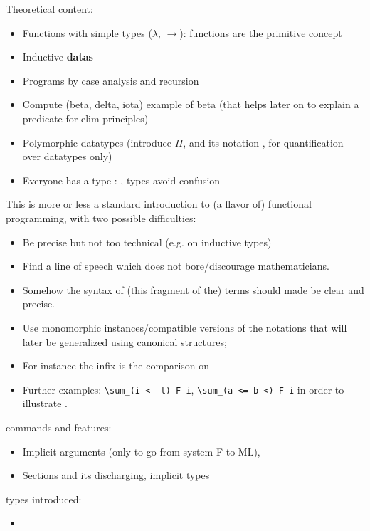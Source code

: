 Theoretical content:
\begin{itemize}
\item Functions with simple types ($\lambda$, $\rightarrow$): functions are the primitive concept
\item Inductive {\bf datas}
\item Programs by case analysis and recursion
\item Compute (beta, delta, iota) example of beta (that helps later on to explain a predicate for elim principles)
\item Polymorphic datatypes (introduce $\Pi$, and its \Coq{} notation
  , for quantification over datatypes only)
\item Everyone has a type : , types avoid confusion
\end{itemize}
This is more or less a standard introduction to (a flavor of)
functional programming, with two possible difficulties:
\begin{itemize}
\item Be precise but not too technical (e.g. on inductive types)
\item Find a line of speech which does not bore/discourage
  mathematicians.
\item Somehow the syntax of (this fragment of the) terms should made
  be clear and precise.
\end{itemize}


\begin{itemize}
\item Use monomorphic instances/compatible versions of the notations
  that will later be generalized using canonical structures;
\item For instance the infix \C{==} is the comparison on 
\item Further examples: \verb+\sum_(i <- l) F i+, \verb+\sum_(a <= b <) F i+
in order to illustrate .
\end{itemize}
\Coq{} commands and features:
\begin{itemize}
\item Implicit arguments (only to go from system F to ML), 
\item Sections and its discharging, implicit types
\end{itemize}


\Coq{} types introduced:
\begin{itemize}
\item {}
\end{itemize}


